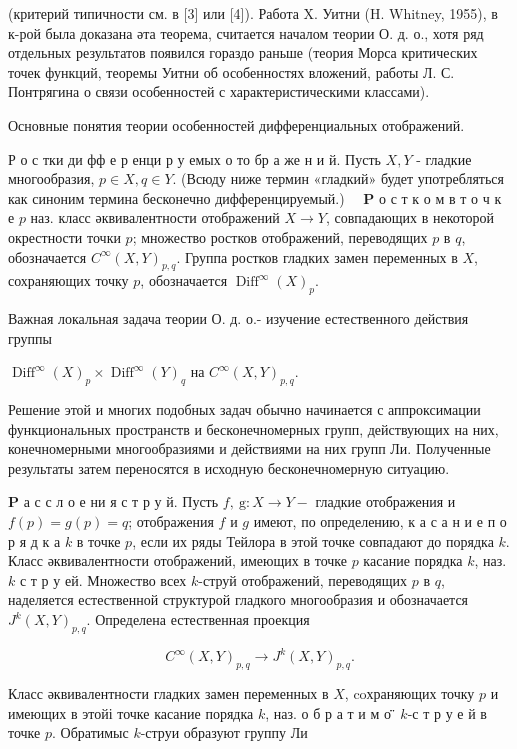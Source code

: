 \documentclass[10pt]{article}
\begin{document}
(критерий типичности см. в [3] или [4]). Работа X. Уитни (H. Whitney, 1955), в к-рой была доказана әта теорема, считается началом теории О. д. о., хотя ряд отдельных результатов появился гораздо раньше (теория Морса критических точек функций, теоремы Уитни об особенностях вложений, работы Л. С. Понтрягина о связи особенностей с характеристическими классами).



Основные понятия теории особенностей дифференциальных отображений.



Р о с тки ди фф е р енци р у емых о то бр а же н и й. Пусть $X, Y$ - гладкие многообразия, $p \in X, q \in Y$. (Всюду ниже термин «гладкий» будет употребляться как синоним термина бесконечно дифференцируемый.) $\quad \mathbf{P}$ о с т к о м в т о ч к е $p$ наз. класс әквивалентности отображений $X \rightarrow Y$, совпадающих в некоторой окрестности точки $p$; множество ростков отображений, переводящих $p$ в $q$, обозначается $C^{\infty}(X, Y)_{p, q}$. Группа ростков гладких замен переменных в $X$, сохраняющих точку $p$, обозначается $\operatorname{Diff}^{\infty}(X)_{p}$.



Важная локальная задача теории О. д. о.- изучение естественного действия группы



$\operatorname{Diff}^{\infty}(X)_{p} \times \operatorname{Diff}^{\infty}(Y)_{q}$ на $C^{\infty}(X, Y)_{p, q}$.



Решение этой и многих подобных задач обычно начинается с аппроксимации функциональных пространств и бесконечномерных групп, действующих на них, конечномерными многообразиями и действиями на них групп Ли. Полученные результаты затем переносятся в исходную бесконечномерную ситуацию.



$\mathbf{P}$ а с с л о е ни я с т р у й. Пусть $f, \mathrm{~g}: X \rightarrow Y-$ гладкие отображения и $f(p)=g(p)=q$; отображения $f$ и $g$ имеют, по определению, к а с а н и е п о р я д к а $k$ в точке $p$, если их ряды Тейлора в этой точке совпадают до порядка $k$. Класс әквивалентности отображений, имеющих в точке $p$ касание порядка $k$, наз. $k$ с т р у ей. Множество всех $k$-струй отображений, переводящих $p$ в $q$, наделяется естественной структурой гладкого многообразия и обозначается $J^{k}(X, Y)_{p, q}$. Определена естественная проекция



\[

C^{\infty}(X, Y)_{p, q} \longrightarrow J^{k}(X, Y)_{p, q} .

\]



Класс әквивалентности гладких замен переменных в $X$, coхраняющих точку $p$ и имеющих в этойі точке касание порядка $k$, наз. о б р а т и м о ̈̈ $k$-с т р у е й в точке $p$. Обратимыс $k$-струи образуют группу Ли
\end{document}
